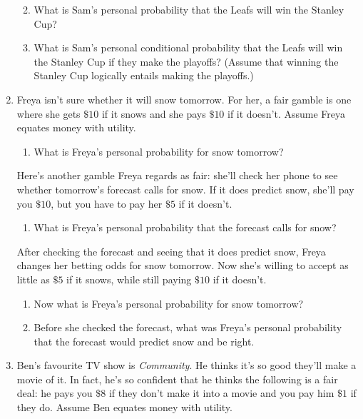 \documentclass[justified]{tufte-book}
\providecommand{\tightlist}{%
  \setlength{\itemsep}{0pt}\setlength{\parskip}{0pt}}
\theoremstyle{definition}
\theoremstyle{definition}
\theoremstyle{definition}
\theoremstyle{remark}
\begin{document}
\begin{enumerate}
  \begin{enumerate}
  \def\labelenumii{\alph{enumii}.}
  \setcounter{enumii}{1}
  \tightlist
  \item
    What is Sam's personal probability that the Leafs will win the Stanley Cup?
  \item
    What is Sam's personal conditional probability that the Leafs will win the Stanley Cup if they make the playoffs? (Assume that winning the Stanley Cup logically entails making the playoffs.)
  \end{enumerate}
\item
  Freya isn't sure whether it will snow tomorrow. For her, a fair gamble is one where she gets \(\$10\) if it snows and she pays \(\$10\) if it doesn't. Assume Freya equates money with utility.

  \begin{enumerate}
  \def\labelenumii{\alph{enumii}.}
  \tightlist
  \item
    What is Freya's personal probability for snow tomorrow?
  \end{enumerate}

  Here's another gamble Freya regards as fair: she'll check her phone to see whether tomorrow's forecast calls for snow. If it does predict snow, she'll pay you \(\$10\), but you have to pay her \(\$5\) if it doesn't.

  \begin{enumerate}
  \def\labelenumii{\alph{enumii}.}
  \setcounter{enumii}{1}
  \tightlist
  \item
    What is Freya's personal probability that the forecast calls for snow?
  \end{enumerate}

  After checking the forecast and seeing that it does predict snow, Freya changes her betting odds for snow tomorrow. Now she's willing to accept as little as \(\$5\) if it snows, while still paying \(\$10\) if it doesn't.

  \begin{enumerate}
  \def\labelenumii{\alph{enumii}.}
  \setcounter{enumii}{2}
  \tightlist
  \item
    Now what is Freya's personal probability for snow tomorrow?
  \item
    Before she checked the forecast, what was Freya's personal probability that the forecast would predict snow and be right.
  \end{enumerate}
\item
  Ben's favourite TV show is \emph{Community}. He thinks it's so good they'll make a movie of it. In fact, he's so confident that he thinks the following is a fair deal: he pays you \(\$8\) if they don't make it into a movie and you pay him \(\$1\) if they do. Assume Ben equates money with utility.


\end{enumerate}
\end{document}
